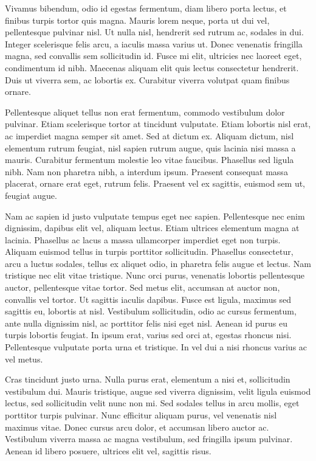 \documentclass[sigconf]{acmart}
\begin{document}
Vivamus bibendum, odio id egestas fermentum, diam libero porta lectus, et finibus turpis tortor quis magna. Mauris lorem neque, porta ut dui vel, pellentesque pulvinar nisl. Ut nulla nisl, hendrerit sed rutrum ac, sodales in dui. Integer scelerisque felis arcu, a iaculis massa varius ut. Donec venenatis fringilla magna, sed convallis sem sollicitudin id. Fusce mi elit, ultricies nec laoreet eget, condimentum id nibh. Maecenas aliquam elit quis lectus consectetur hendrerit. Duis ut viverra sem, ac lobortis ex. Curabitur viverra volutpat quam finibus ornare.

Pellentesque aliquet tellus non erat fermentum, commodo vestibulum dolor pulvinar. Etiam scelerisque tortor at tincidunt vulputate. Etiam lobortis nisl erat, ac imperdiet magna semper sit amet. Sed at dictum ex. Aliquam dictum, nisl elementum rutrum feugiat, nisl sapien rutrum augue, quis lacinia nisi massa a mauris. Curabitur fermentum molestie leo vitae faucibus. Phasellus sed ligula nibh. Nam non pharetra nibh, a interdum ipsum. Praesent consequat massa placerat, ornare erat eget, rutrum felis. Praesent vel ex sagittis, euismod sem ut, feugiat augue.

Nam ac sapien id justo vulputate tempus eget nec sapien. Pellentesque nec enim dignissim, dapibus elit vel, aliquam lectus. Etiam ultrices elementum magna at lacinia. Phasellus ac lacus a massa ullamcorper imperdiet eget non turpis. Aliquam euismod tellus in turpis porttitor sollicitudin. Phasellus consectetur, arcu a luctus sodales, tellus ex aliquet odio, in pharetra felis augue et lectus. Nam tristique nec elit vitae tristique. Nunc orci purus, venenatis lobortis pellentesque auctor, pellentesque vitae tortor. Sed metus elit, accumsan at auctor non, convallis vel tortor. Ut sagittis iaculis dapibus. Fusce est ligula, maximus sed sagittis eu, lobortis at nisl. Vestibulum sollicitudin, odio ac cursus fermentum, ante nulla dignissim nisl, ac porttitor felis nisi eget nisl. Aenean id purus eu turpis lobortis feugiat. In ipsum erat, varius sed orci at, egestas rhoncus nisi. Pellentesque vulputate porta urna et tristique. In vel dui a nisi rhoncus varius ac vel metus.

Cras tincidunt justo urna. Nulla purus erat, elementum a nisi et, sollicitudin vestibulum dui. Mauris tristique, augue sed viverra dignissim, velit ligula euismod lectus, sed sollicitudin velit nunc non mi. Sed sodales tellus in arcu mollis, eget porttitor turpis pulvinar. Nunc efficitur aliquam purus, vel venenatis nisl maximus vitae. Donec cursus arcu dolor, et accumsan libero auctor ac. Vestibulum viverra massa ac magna vestibulum, sed fringilla ipsum pulvinar. Aenean id libero posuere, ultrices elit vel, sagittis risus.
\end{document}
